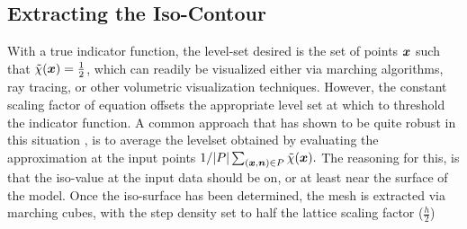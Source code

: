 \subsection{Extracting the Iso-Contour}\label{sec:levelset}
With a true indicator function, the level-set desired is the set of points $\boldsymbol{x}$ such that $\tilde{\chi}(\boldsymbol{x}) = \frac{1}{2}$, which can readily be visualized either via marching algorithms, ray tracing, or other volumetric visualization techniques. 
However, the constant scaling factor of equation  offsets the appropriate level set at which to threshold the indicator function. 
A common approach that has shown to be quite robust in this situation \cite{fftk}, is to average the levelset obtained by evaluating the approximation at the input points ${1}/{|P|}\sum_{(\boldsymbol{x},\boldsymbol{n})\in P}{\tilde{\chi}(\boldsymbol{x})}.$ 
The reasoning for this, is that the iso-value at the input data should be on, or at least near the surface of the model. 
Once the iso-surface has been determined, the mesh is extracted via marching cubes, with the step density set to half the lattice scaling factor ($\frac{h}{2}$) %
